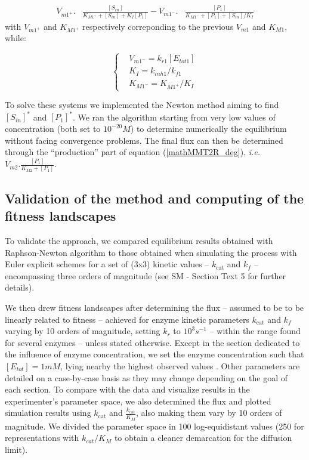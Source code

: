 \documentclass[nogrid,crop,final]{MBE2}%
\begin{document}
\footnotesize
\begin{equation*}
		\begin{aligned}
		V_{m1^{+}}.&\frac{[S_{in}]}{K_{M1^{+}}+[S_{in}]+K_I [P_1]}-V_{m1^{-}}.&\frac{[P_1]}{K_{M1^{-}}+[P_1]+[S_{in}]/K_I}
		\end{aligned}
		\label{mathMMT1R_rev}
\end{equation*}
\normalsize
with $V_{m1^{+}}$ and $K_{M1^{+}}$ respectively correponding to the previous $V_{m1}$ and $K_{M1}$, while:

\small
\begin{equation*}
  \left\{
      \begin{aligned}
		&V_{m1^{-}}=k_{r1}[E_{tot1}]\\
		&K_I=k_{inh1}/k_{f1}\\
		&K_{M1^{-}}=K_{M1^{+}}/K_I
      \end{aligned}
    \right.
\end{equation*}

\normalsize
To solve these systems %
we implemented the Newton method \citep{Atkinson89} aiming to find $[S_{in}]^*$ and $[P_1]^*$. We ran the algorithm starting from very low values of concentration (both set to $10^{-20}M$) to determine numerically the equilibrium without facing convergence problems. The final flux can then be determined through the ``production'' part of equation (\ref{mathMMT2R_deg}), \textit{i.e.} $V_{m2}.\frac{[P_1]}{K_{M2}+[P_1]}$.


\subsection{Validation of the method and computing of the fitness landscapes}

To validate the approach, we compared equilibrium results obtained with Raphson-Newton algorithm to those obtained when simulating the process with Euler explicit schemes for a set of (3x3) kinetic values -- $k_\text{cat}$ and $k_f$ -- encompassing three orders of magnitude (see SM - Section Text 5 for further details).

We then drew fitness landscapes after determining the flux -- assumed to be to be linearly related to fitness -- achieved for enzyme kinetic parameters $k_\text{cat}$ and $k_f$ varying by 10 orders of magnitude, setting $k_r$ to $10^3 s^{-1}$ -- within the range found for several enzymes \citep{Klipp94,Knowles77} -- unless stated otherwise. Except in the section dedicated to the influence of enzyme concentration, we set the enzyme concentration such that $[E_{tot}]=1mM$, lying nearby the highest observed values \citep{Albe90,Noor16}. Other parameters are detailed on a case-by-case basis as they may change depending on the goal of each section. To compare with the data and visualize results in the experimenter's parameter space, we also determined the flux and plotted simulation results using $k_\text{cat}$ and $\frac{k_\text{cat}}{K_M}$, also making them vary by 10 orders of magnitude. We divided the parameter space in 100 log-equidistant values (250 for representations with $k_{cat}/K_M$ to obtain a cleaner demarcation for the diffusion limit).
\end{document}
